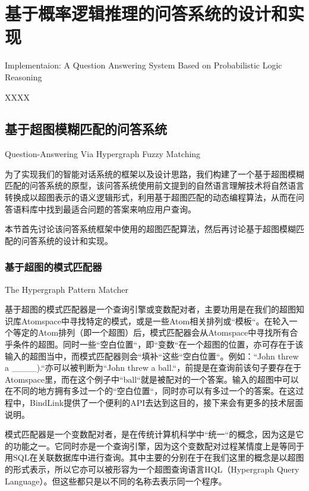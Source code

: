 \chapter{基于概率逻辑推理的问答系统的设计和实现}{Implementaion: A Question Answering System Based on Probabilistic Logic Reasoning}
\label{chap:dialogue}

XXXX




\section{基于超图模糊匹配的问答系统}{Question-Answering Via Hypergraph Fuzzy Matching}

为了实现我们的智能对话系统的框架以及设计思路，我们构建了一个基于超图模糊匹配的问答系统的原型，该问答系统使用前文提到的自然语言理解技术将自然语言转换成以超图表示的语义逻辑形式，利用基于超图匹配的动态编程算法，从而在问答语料库中找到最适合问题的答案来响应用户查询。

本节首先讨论该问答系统框架中使用的超图匹配算法，然后再讨论基于超图模糊匹配的问答系统的设计和实现。

\subsection{基于超图的模式匹配器}{The Hypergraph Pattern Matcher}

基于超图的模式匹配器是一个查询引擎或变数配对者，主要功用是在我们的超图知识库Atomspace中寻找特定的模式，或是一些Atom相关排列或“模板“。在轮入一个等定的Atom排列（即一个超图）后，模式匹配器会从Atomspace中寻找所有合乎条件的超图。同时一些“空白位置“，即“变数“在一个超图的位置，亦可存在于该输入的超图当中，而模式匹配器则会“填补“这些“空白位置“。例如：“John threw a \_\_\_\_).“亦可以被判断为“John threw a ball.“，前提是在查询前该句子要存在于Atomspace里，而在这个例子中“ball“就是被配对的一个答案。输入的超图中可以在不同的地方拥有多过一个的“空白位置“，同时亦可以有多过一个的答案。在这过程中，BindLink提供了一个便利的API去达到这目的，接下来会有更多的技术层面说明。

模式匹配器是一个变数配对者，是在传统计算机科学中“统一“的概念，因为这是它的功能之一。它同时亦是一个查询引擎，因为这个变数配对过程某情度上是等同于用SQL在关联数据库中进行查询。其中主要的分别在于在我们这里的概念是以超图的形式表示，所以它亦可以被形容为一个超图查询语言HQL（Hypergraph Query Language）。但这些都只是以不同的名称去表示同一个程序。

